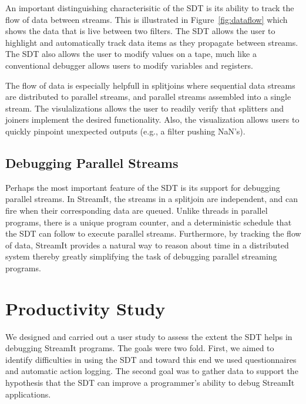 \documentclass[11pt, letterpaper, onecolumn]{article}
\begin{document}
An important distinguishing characterisitic  of the SDT is its ability
to track  the flow  of data between  streams.  This is  illustrated in
Figure~\ref{fig:dataflow} which shows the data that is live between
two filters.  The  SDT allows the user to  highlight and automatically
track  data items  as they  propagate between  streams.  The  SDT also
allows the user  to modify values on a tape,  much like a conventional
debugger allows users to modify variables and registers.

The flow of data is especially helpfull in splitjoins where sequential
data streams are distributed to parallel streams, and parallel streams
assembled into a single stream. The visulalizations allows the user to
readily  verify  that  splitters  and joiners  implement  the  desired
functionality.  Also,  the   visualization  allows  users  to  quickly
pinpoint unexpected outputs (e.g., a filter pushing NaN's).


\subsection{Debugging Parallel Streams}

Perhaps  the most  important feature  of the  SDT is  its  support for
debugging parallel  streams. In StreamIt,  the streams in  a splitjoin
are  independent,  and can  fire  when  their  corresponding data  are
queued. Unlike threads in parallel programs, there is a unique program
counter,  and a  deterministic schedule  that  the SDT  can follow  to
execute parallel streams.  Furthermore,  by tracking the flow of data,
StreamIt provides a natural way  to reason about time in a distributed
system  thereby greatly  simplifying  the task  of debugging  parallel
streaming programs.


\section{Productivity Study}

We designed and carried out a  user study to assess the extent the SDT
helps in debugging StreamIt programs.  The goals were two fold. First,
we aimed to identify difficulties in using the SDT and toward this end
we used questionnaires and  automatic action logging.  The second goal
was to gather data to support  the hypothesis that the SDT can improve
a programmer's ability to debug StreamIt applications.
\end{document}
